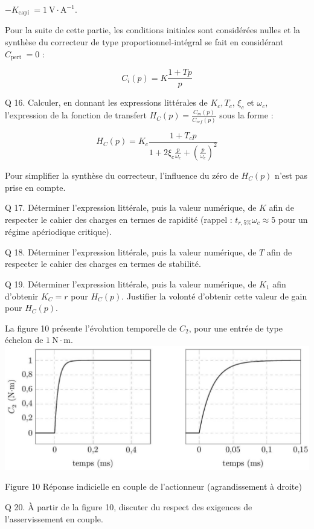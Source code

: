 \documentclass[10pt]{article}
\begin{document}
$-K_{\text {capi }}=1 \mathrm{~V} \cdot \mathrm{A}^{-1}$.

Pour la suite de cette partie, les conditions initiales sont considérées nulles et la synthèse du correcteur de type proportionnel-intégral se fait en considérant $C_{\text {pert }}=0$ :

$$
C_{i}(p)=K \frac{1+T p}{p}
$$

Q 16. Calculer, en donnant les expressions littérales de $K_{c}, T_{c}$, $\xi_{c}$ et $\omega_{c}$, l'expression de la fonction de transfert $H_{C}(p)=\frac{C_{m}(p)}{C_{r e f}(p)}$ sous la forme :

$$
H_{C}(p)=K_{c} \frac{1+T_{c} p}{1+2 \xi_{c} \frac{p}{\omega_{c}}+\left(\frac{p}{\omega_{c}}\right)^{2}}
$$

Pour simplifier la synthèse du correcteur, l'influence du zéro de $H_{C}(p)$ n'est pas prise en compte.

Q 17. Déterminer l'expression littérale, puis la valeur numérique, de $K$ afin de respecter le cahier des charges en termes de rapidité (rappel : $t_{r, 5 \%} \omega_{c} \approx 5$ pour un régime apériodique critique).

Q 18. Déterminer l'expression littérale, puis la valeur numérique, de $T$ afin de respecter le cahier des charges en termes de stabilité.

Q 19. Déterminer l'expression littérale, puis la valeur numérique, de $K_{1}$ afin d'obtenir $K_{C}=r$ pour $H_{C}(p)$. Justifier la volonté d'obtenir cette valeur de gain pour $H_{C}(p)$.

La figure 10 présente l'évolution temporelle de $C_{2}$, pour une entrée de type échelon de $1 \mathrm{~N} \cdot \mathrm{m}$.
\includegraphics[max width=\textwidth, center]{2023_05_12_54c6a64d2ffce28d5c72g-08}

Figure 10 Réponse indicielle en couple de l'actionneur (agrandissement à droite)

Q 20. À partir de la figure 10, discuter du respect des exigences de l'asservissement en couple.
\end{document}
